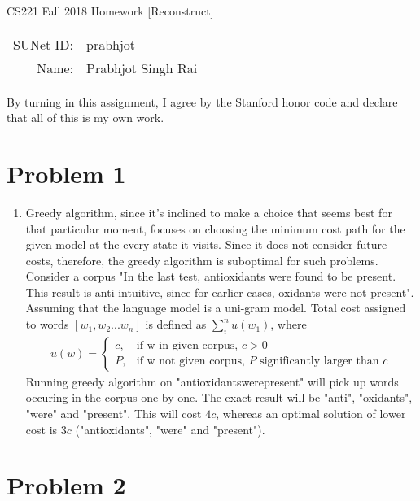\documentclass[12pt]{article}
\begin{document}
\begin{center}
{\Large CS221 Fall 2018 Homework [Reconstruct]}

\begin{tabular}{rl}
SUNet ID: & prabhjot \\
Name: & Prabhjot Singh Rai
\end{tabular}
\end{center}

By turning in this assignment, I agree by the Stanford honor code and declare
that all of this is my own work.

\section*{Problem 1}

\begin{enumerate}[label=(\alph*)]
  \item Greedy algorithm, since it's inclined to make a choice that seems best for that particular moment, focuses on choosing the minimum cost path for the given model at the every state it visits. Since it does not consider future costs, therefore, the greedy algorithm is suboptimal for such problems. Consider a corpus "In the last test, antioxidants were found to be present. This result is anti intuitive, since for earlier cases, oxidants were not present". Assuming that the language model is a uni-gram model. Total cost assigned to words $[w_1, w_2 ... w_n]$ is defined as $\sum_{i}^n u(w_1)$, where \\
  \begin{align*}
  u(w) = \begin{cases} 
  c, & \text{if w in given corpus, $c > 0$} \\
  P, & \text{if w not given corpus, $P$ significantly larger than $c$}
  \end{cases}
  \end{align*}
  Running greedy algorithm on "antioxidantswerepresent" will pick up words occuring in the corpus one by one. The exact result will be "anti", "oxidants", "were" and "present". This will cost $4c$, whereas an optimal solution of lower cost is $3c$ ("antioxidants", "were" and "present").
  
\end{enumerate}

\section*{Problem 2}
\end{document}
